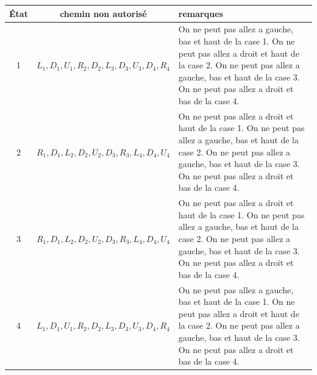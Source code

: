 \noindent\begin{tabularx}{\linewidth}{|c|c|X|}
  \hline
  État & chemin non autorisé & remarques \\
  \hline
  1 & $L_1, D_1, U_1, R_2, D_2, L_3, D_3, U_3, D_4,R_4$  & On ne peut pas allez a gauche, bas et haut de la case 1. On ne peut pas allez a droit et haut de la case 2. On ne peut pas allez a gauche, bas et haut de la case 3. On ne peut pas allez a droit et bas de la case 4.  \\
  2 & $R_1, D_1, L_2, D_2, U_2, D_3,R_3 , L_4, D_4, U_4  $&  On ne peut pas allez a droit et haut de la case 1. On ne peut pas allez a gauche, bas et haut de la case 2. On ne peut pas allez a gauche, bas et haut de la case 3. On ne peut pas allez a droit et bas de la case 4.  \\
  3 & $R_1, D_1, L_2, D_2, U_2, D_3,R_3 , L_4, D_4, U_4$&  On ne peut pas allez a droit et haut de la case 1. On ne peut pas allez a gauche, bas et haut de la case 2. On ne peut pas allez a gauche, bas et haut de la case 3. On ne peut pas allez a droit et bas de la case 4.  \\
  4 & $L_1, D_1, U_1, R_2, D_2, L_3, D_3, U_3, D_4,R_4$  & On ne peut pas allez a gauche, bas et haut de la case 1. On ne peut pas allez a droit et haut de la case 2. On ne peut pas allez a gauche, bas et haut de la case 3. On ne peut pas allez a droit et bas de la case 4.  \\
  \hline
\end{tabularx}\\





